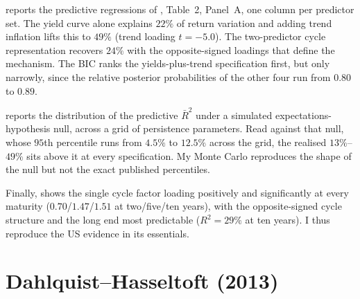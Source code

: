  reports the predictive regressions of \citet{cieslak2015},
Table~2, Panel~A, one column per predictor set. The yield curve alone explains
$22\%$ of return variation and adding trend inflation lifts this to $49\%$ (trend loading $t=-5.0$). The
two-predictor cycle representation recovers $24\%$ with the opposite-signed
loadings that define the mechanism. The BIC ranks the yields-plus-trend
specification first, but only narrowly, since the relative posterior
probabilities of the other four run from $0.80$ to $0.89$.

\begin{table}[t]
  \caption{Replication of Cieslak--Povala (2015) Table~2, Panel~A: predictive regressions}
  \label{tab:cp-t2a}
  \centering
  
\end{table}

 reports the distribution of the predictive $\bar{R}^{2}$ under a
simulated expectations-hypothesis null, across a grid of persistence parameters.
Read against that null, whose $95$th percentile runs from $4.5\%$ to $12.5\%$
across the grid, the realised $13\%$--$49\%$ sits above it at every specification. My
Monte Carlo reproduces the shape of the null but not the exact published
percentiles.

\begin{table}[t]
  \caption{Predictive $R^{2}$ under the expectations-hypothesis null (CP Table~2, Panel~B)}
  \label{tab:cp-t2b}
  \centering
  
\end{table}

Finally,  shows the single cycle factor loading positively and
significantly at every maturity ($0.70$/$1.47$/$1.51$ at two/five/ten years),
with the opposite-signed cycle structure and the long end most predictable
($R^{2}=29\%$ at ten years). I thus reproduce the US evidence in its essentials.

\begin{table}[t]
  \caption{Replication of Cieslak--Povala (2015) Table~4: individual returns on the cycle factor}
  \label{tab:cp-t4}
  \centering
  
\end{table}

\section{Dahlquist--Hasseltoft (2013)}
\label{sec:rep-dh}


